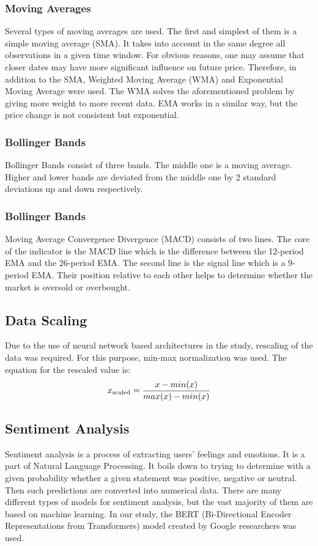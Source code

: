 \documentclass[11pt]{article} %
\begin{document}
\subsubsection{Moving Averages}
Several types of moving averages are used. The first and simplest of them is a simple moving average (SMA). It takes into account in the same degree all observations in a given time window. For obvious reasons, one may assume that closer dates may have more significant influence on future price. Therefore, in addition to the SMA, Weighted Moving Average (WMA) and Exponential Moving Average were used. The WMA solves the aforementioned problem by giving more weight to more recent data. EMA works in a similar way, but the price change is not consistent but exponential.

\subsubsection{Bollinger Bands}
Bollinger Bands consist of three bands. The middle one is a moving average. Higher and lower bands are deviated from the middle one by 2 standard deviations up and down respectively. 

\subsubsection{Bollinger Bands}
Moving Average Convergence Divergence (MACD) consists of two lines. The core of the indicator is the MACD line which is the difference between the 12-period EMA and the 26-period EMA. The second line is the signal line which is a 9-period EMA. Their position relative to each other helps to determine whether the market is oversold or overbought.


\subsection{Data Scaling}
Due to the use of neural network based architectures in the study, rescaling of the data was required. For this purpose, min-max normalization was used. The equation for the rescaled value is: 
\[ x\textsubscript{scaled} = \frac{x - min(x)}{max(x) - min(x)} \]

\subsection{Sentiment Analysis}
Sentiment analysis is a process of extracting users' feelings and emotions. It is a part of Natural Language Processing. It boils down to trying to determine with a given probability whether a given statement was positive, negative or neutral. Then such predictions are converted into numerical data. There are many different types of models for sentiment analysis, but the vast majority of them are based on machine learning. In our study, the BERT (Bi-Directional Encoder Representations from Transformers) model created by Google researchers was used. 
\end{document}

